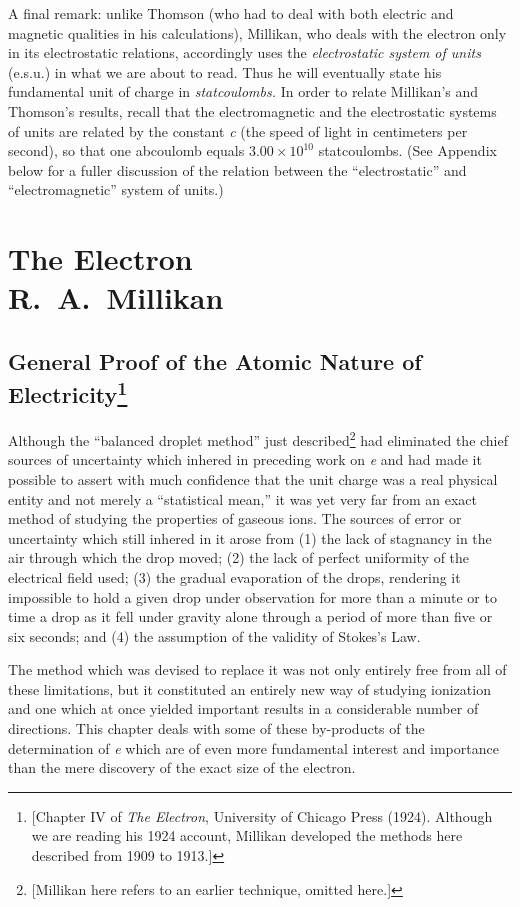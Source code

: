 A final remark: unlike Thomson (who had to deal with both electric and
magnetic qualities in his calculations), Millikan, who deals with the
electron only in its e\-lec\-tro\-stat\-ic relations, accordingly uses the
\emph{e\-lec\-tro\-stat\-ic system of units} (e.s.u.) in what we are about to
read. Thus he will eventually state his fundamental unit of charge in
\emph{stat\-cou\-lombs.} In order to relate Millikan's and Thomson's
results, recall that the electromagnetic and the e\-lec\-tro\-stat\-ic systems
of units are related by the constant \emph{c} (the speed of light in 
centimeters per second), so that one abcoulomb
equals $3.00 \times 10^{10}$ stat\-cou\-lombs. (See Appendix below
for a fuller discussion of the relation between the ``e\-lec\-tro\-stat\-ic''
and ``electromagnetic'' system of units.)

\section*{The Electron\\ {\large R.\ A.\ Millikan}}

\subsection*{General Proof of the Atomic Nature of Electricity\footnote{[Chapter IV of \emph{The Electron}, University of
  Chicago Press (1924). Although we are reading his 1924 account,
  Millikan developed the methods here described from 1909 to 1913.]}}


Although the ``balanced droplet method'' just described\footnote{{[}Millikan
  here refers to an earlier technique, omitted here.{]}} had eliminated
the chief sour\-ces of uncertainty which inhered in preceding work on
\emph{e} and had made it possible to assert with much confidence that
the unit charge was a real physical entity and not merely a
``statistical mean,'' it was yet very far from an exact method of
studying the properties of gaseous ions. The sour\-ces of error or
uncertainty which still inhered in it arose from (1) the lack of
stagnancy in the air through which the drop moved; (2) the lack of
perfect uniformity of the electrical field used; (3) the gradual
evaporation of the drops, rendering it impossible to hold a given drop
under observation for more than a minute or to time a drop as it fell
under gravity alone through a period of more than five or six seconds;
and (4) the assumption of the validity of Stokes's Law.

The method which was devised to replace it was not only entirely free
from all of these limitations, but it constituted an entirely new way of
studying ionization and one which at once yielded important results in a
considerable number of directions. This chapter deals with some of these
by-products of the determination of \emph{e} which are of even more
fundamental interest and importance than the mere discovery of the exact
size of the electron.

